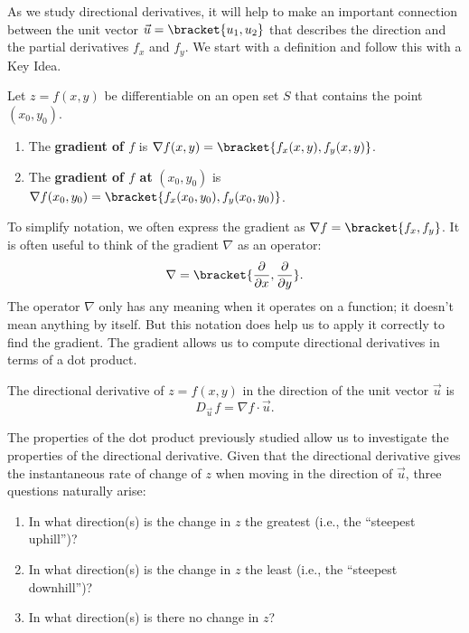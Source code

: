 As we study directional derivatives, it will help to make an important connection between the unit vector $\vec u =\bracket{u_1,u_2}$ that describes the direction and the partial derivatives $f_x$ and $f_y$. We start with a definition and follow this with a Key Idea.

{Let $z=f(x,y)$ be differentiable on an open set $S$ that contains the point $(x_0,y_0)$.
\begin{enumerate}
	\item The \textbf{gradient of $f$} is $\nabla f(x,y) =\bracket{f_x(x,y),f_y(x,y)}$.
	\item The \textbf{gradient of $f$ at} $(x_0,y_0)$ is $\nabla f(x_0,y_0) =\bracket{f_x(x_0,y_0),f_y(x_0,y_0)}$.
\end{enumerate}
}


To simplify notation, we often express the gradient as $\nabla f =\bracket{f_x, f_y}$. It is often useful to think of the gradient $\nabla$ as an operator:%
\[\nabla=\bracket{\frac\partial{\partial x},\frac\partial{\partial y}}.\]
The operator $\nabla$ only has any meaning when it operates on a function; it doesn't mean anything by itself.  But this notation does help us to apply it correctly to find the gradient. The gradient allows us to compute directional derivatives in terms of a dot product.

{%
The directional derivative of $z=f(x,y)$ in the direction of the unit vector $\vec u$ is
\[D_{\vec u\,}f = \nabla f\cdot \vec u.\]}

The properties of the dot product previously studied allow us to investigate the properties of the directional derivative. Given that the directional derivative gives the instantaneous rate of change of $z$ when moving in the direction of $\vec u$, three questions naturally arise:
\begin{enumerate}
	\item In what direction(s) is the change in $z$ the greatest (i.e., the ``steepest uphill'')?
	\item In what direction(s) is the change in $z$ the least (i.e.,  the ``steepest downhill'')?
	\item In what direction(s) is there no change in $z$?
\end{enumerate}

